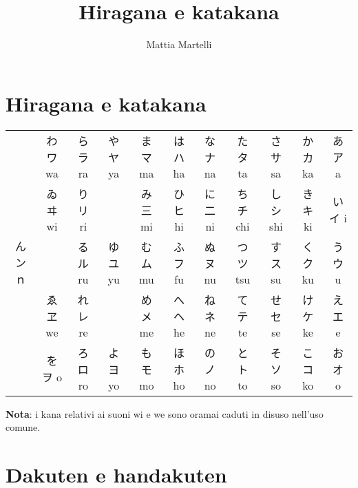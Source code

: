 \documentclass{article}
\title{Hiragana e katakana}
\author{Mattia Martelli}
\begin{document}
    \maketitle

    \tableofcontents

    \section{Hiragana e katakana}

        \begin{center}
            \begin{japanese}
                \begin{tabular}{|c|c|c|c|c|c|c|c|c|c|c|}
                    \hline
                    \multirow{5}{*}{ん ン ｎ}
                        & わ ワ wa & ら ラ ra & や ヤ ya & ま マ ma & は ハ ha & な ナ na & た タ ta & さ サ sa & か カ ka & あ ア a\\
                        \cline{2-11}
                        & ゐ ヰ wi & り リ ri & & み 三 mi & ひ ヒ hi & に 二 ni & ち チ chi & し シ shi & き キ ki & い イ i\\
                        \cline{2-11}
                        & & る ル ru & ゆ ユ yu & む ム mu & ふ フ fu & ぬ ヌ nu & つ ツ tsu & す ス su & く ク ku & う ウ u\\
                        \cline{2-11}
                        & ゑ ヱ we & れ レ re & & め メ me & へ ヘ he & ね ネ ne & て テ te & せ セ se & け ケ ke & え エ e\\
                        \cline{2-11}
                        & を ヲ o & ろ ロ ro & よ ヨ yo & も モ mo & ほ ホ ho & の ノ no & と ト to & そ ソ so & こ コ ko & お オ o\\
                    \hline
                \end{tabular}
            \end{japanese}
        \end{center}

        \textbf{Nota}: i kana relativi ai suoni \textjapanese{wi} e \textjapanese{we} sono oramai caduti in disuso nell'uso comune.
    
    \section{Dakuten e handakuten}
\end{document}
